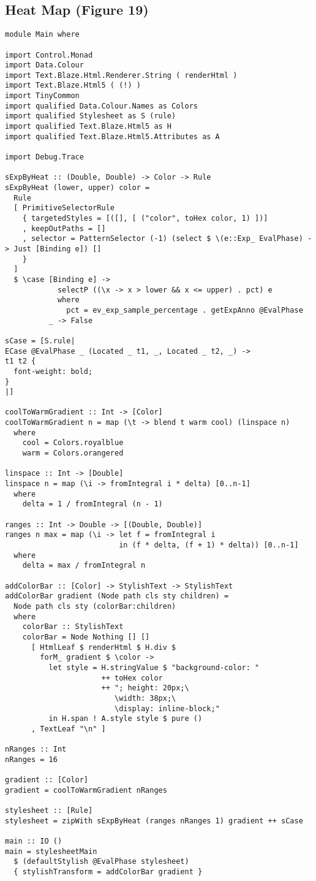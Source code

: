 \documentclass[acmsmall, screen]{acmart}
\begin{document}
\subsection{Heat Map (Figure 19)}
\label{sec:listing-heat-map}
{\scriptsize
\begin{verbatim}
module Main where

import Control.Monad
import Data.Colour
import Text.Blaze.Html.Renderer.String ( renderHtml )
import Text.Blaze.Html5 ( (!) )
import TinyCommon
import qualified Data.Colour.Names as Colors
import qualified Stylesheet as S (rule)
import qualified Text.Blaze.Html5 as H
import qualified Text.Blaze.Html5.Attributes as A

import Debug.Trace

sExpByHeat :: (Double, Double) -> Color -> Rule
sExpByHeat (lower, upper) color =
  Rule
  [ PrimitiveSelectorRule
    { targetedStyles = [([], [ ("color", toHex color, 1) ])]
    , keepOutPaths = []
    , selector = PatternSelector (-1) (select $ \(e::Exp_ EvalPhase) -> Just [Binding e]) []
    }
  ]
  $ \case [Binding e] ->
            selectP ((\x -> x > lower && x <= upper) . pct) e
            where
              pct = ev_exp_sample_percentage . getExpAnno @EvalPhase
          _ -> False

sCase = [S.rule|
ECase @EvalPhase _ (Located _ t1, _, Located _ t2, _) ->
t1 t2 {
  font-weight: bold;
}
|]

coolToWarmGradient :: Int -> [Color]
coolToWarmGradient n = map (\t -> blend t warm cool) (linspace n)
  where
    cool = Colors.royalblue
    warm = Colors.orangered

linspace :: Int -> [Double]
linspace n = map (\i -> fromIntegral i * delta) [0..n-1]
  where
    delta = 1 / fromIntegral (n - 1)

ranges :: Int -> Double -> [(Double, Double)]
ranges n max = map (\i -> let f = fromIntegral i
                          in (f * delta, (f + 1) * delta)) [0..n-1]
  where
    delta = max / fromIntegral n

addColorBar :: [Color] -> StylishText -> StylishText
addColorBar gradient (Node path cls sty children) =
  Node path cls sty (colorBar:children)
  where
    colorBar :: StylishText
    colorBar = Node Nothing [] []
      [ HtmlLeaf $ renderHtml $ H.div $
        forM_ gradient $ \color ->
          let style = H.stringValue $ "background-color: "
                      ++ toHex color
                      ++ "; height: 20px;\
                         \width: 38px;\
                         \display: inline-block;"
          in H.span ! A.style style $ pure ()
      , TextLeaf "\n" ]

nRanges :: Int
nRanges = 16

gradient :: [Color]
gradient = coolToWarmGradient nRanges

stylesheet :: [Rule]
stylesheet = zipWith sExpByHeat (ranges nRanges 1) gradient ++ sCase

main :: IO ()
main = stylesheetMain
  $ (defaultStylish @EvalPhase stylesheet)
  { stylishTransform = addColorBar gradient }

\end{verbatim}}
\clearpage
  
\end{document}
